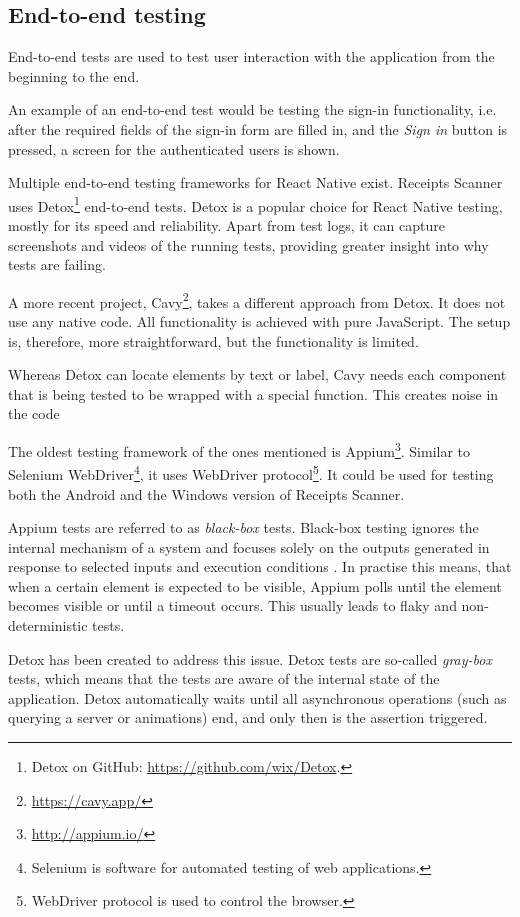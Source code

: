 \documentclass[
  digital, %
  table,   %
  oneside, %
  lof,     %
  lot,     %
]{fithesis3}
\begin{document}
\subsection{End-to-end testing}
\label{sec:end_to_end_testing}
End-to-end tests are used to test user interaction with the application from the beginning to the end. 

An example of an end-to-end test would be testing the sign-in functionality, i.e. after the required fields of the sign-in form are filled in, and the \textit{Sign in} button is pressed, a screen for the authenticated users is shown.

Multiple end-to-end testing frameworks for React Native exist. Receipts Scanner uses Detox\footnote{Detox on GitHub: \url{https://github.com/wix/Detox}.} end-to-end tests. Detox is a popular choice for React Native testing, mostly for its speed and reliability. Apart from test logs, it can capture screenshots and videos of the running tests, providing greater insight into why tests are failing.

A more recent project, Cavy\footnote{\url{https://cavy.app/}}, takes a different approach from Detox. It does not use any native code. All functionality is achieved with pure JavaScript. The setup is, therefore, more straightforward, but the functionality is limited.

Whereas Detox can locate elements by text or label, Cavy needs each component that is being tested to be wrapped with a special function. This creates noise in the code

The oldest testing framework of the ones mentioned is Appium\footnote{\url{http://appium.io/}}. Similar to Selenium WebDriver\footnote{Selenium is software for automated testing of web applications.}, it uses WebDriver protocol\footnote{WebDriver protocol is used to control the browser.}. It could be used for testing both the Android and the Windows version of Receipts Scanner.

Appium tests are referred to as \textit{black-box} tests. Black-box testing ignores the internal mechanism of a system and focuses solely on the outputs generated in response to selected inputs and execution conditions \cite{Gao2003Testing}. In practise this means, that when a certain element is expected to be visible, Appium polls until the element becomes visible or until a timeout occurs. This usually leads to flaky and non-deterministic tests.

Detox has been created to address this issue. Detox tests are so-called \textit{gray-box} tests, which means that the tests are aware of the internal state of the application. Detox automatically waits until all asynchronous operations (such as querying a server or animations) end, and only then is the assertion triggered.
\end{document}
